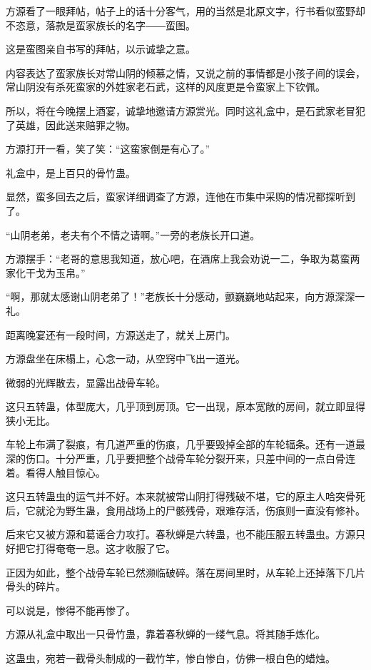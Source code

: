 
\begin{this_body}

方源看了一眼拜帖，帖子上的话十分客气，用的当然是北原文字，行书看似蛮野却不恣意，落款是蛮家族长的名字――蛮图。

这是蛮图亲自书写的拜帖，以示诚挚之意。

内容表达了蛮家族长对常山阴的倾慕之情，又说之前的事情都是小孩子间的误会，常山阴没有杀死蛮家的外姓家老石武，这样的风度更是令蛮家上下钦佩。

所以，将在今晚摆上酒宴，诚挚地邀请方源赏光。同时这礼盒中，是石武家老冒犯了英雄，因此送来赔罪之物。

方源打开一看，笑了笑：“这蛮家倒是有心了。”

礼盒中，是上百只的骨竹蛊。

显然，蛮多回去之后，蛮家详细调查了方源，连他在市集中采购的情况都探听到了。

“山阴老弟，老夫有个不情之请啊。”一旁的老族长开口道。

方源摆手：“老哥的意思我知道，放心吧，在酒席上我会劝说一二，争取为葛蛮两家化干戈为玉帛。”

“啊，那就太感谢山阴老弟了！”老族长十分感动，颤巍巍地站起来，向方源深深一礼。

距离晚宴还有一段时间，方源送走了，就关上房门。

方源盘坐在床榻上，心念一动，从空窍中飞出一道光。

微弱的光辉散去，显露出战骨车轮。

这只五转蛊，体型庞大，几乎顶到房顶。它一出现，原本宽敞的房间，就立即显得狭小无比。

车轮上布满了裂痕，有几道严重的伤痕，几乎要毁掉全部的车轮辐条。还有一道最深的伤口。十分严重，几乎要把整个战骨车轮分裂开来，只差中间的一点白骨连着。看得人触目惊心。

这只五转蛊虫的运气并不好。本来就被常山阴打得残破不堪，它的原主人哈突骨死后，它就沦为野生蛊，食用战场上的尸骸残骨，艰难存活，伤痕则一直没有修补。

后来它又被方源和葛谣合力攻打。春秋蝉是六转蛊，也不能压服五转蛊虫。方源只好把它打得奄奄一息。这才收服了它。

正因为如此，整个战骨车轮已然濒临破碎。落在房间里时，从车轮上还掉落下几片骨头的碎片。

可以说是，惨得不能再惨了。

方源从礼盒中取出一只骨竹蛊，靠着春秋蝉的一缕气息。将其随手炼化。

这蛊虫，宛若一截骨头制成的一截竹竿，惨白惨白，仿佛一根白色的蜡烛。


\end{this_body}
